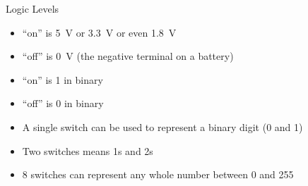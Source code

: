 \documentclass{beamer}
\begin{document}
\begin{frame}{Logic Levels}
  \begin{itemize}
  \item
    ``on'' is \SI{5}{\volt} or \SI{3.3}{\volt} or even \SI{1.8}{\volt}
  \item
    ``off'' is \SI{0}{\volt} (the negative terminal on a battery)
  \item
    ``on'' is 1 in binary 
  \item
    ``off'' is 0 in binary
  \item
    A single switch can be used to represent a binary digit (0 and 1)
  \item
    Two switches means 1s and 2s
  \item
    8 switches can represent any whole number between 0 and 255
  \end{itemize}
\end{frame}
\end{document}
